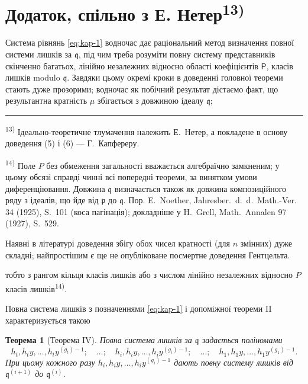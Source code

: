 \documentclass[11pt]{article}
\newcommand{\foreign}[1]{#1}
\theoremstyle{plain}
\newtheorem{satz}{Теорема}
\begin{document}
\newpage
\section*{Додаток, спільно з Е. Нетер\textsuperscript{13)}}

Система рівнянь \eqref{eq:kap-1} водночас дає раціональний метод
визначення повної системи лишків за $\mathfrak{q}$, під чим треба
розуміти повну систему представників скінченно багатьох, лінійно
незалежних відносно області коефіцієнтів $\mathsf{P}$, класів лишків modulo
$\mathfrak{q}$. Завдяки цьому окремі кроки в доведенні головної
теореми стають дуже прозорими; водночас як побічний результат
дістаємо факт, що результантна кратність $\mu$ збігається з
довжиною ідеалу $\mathfrak{q}$;

\vspace{0.5em}
\noindent\rule{\textwidth}{0.4pt}
\vspace{0.3em}

{\footnotesize
\textsuperscript{13)} Ідеально-теоретичне тлумачення належить Е.\ Нетер, а
покладене в основу доведення (5) і (6) --- Г.\ Капфереру.

\textsuperscript{14)} Поле $P$ без обмеження загальності вважається
алгебраїчно замкненим; у цьому обсязі справді чинні всі попередні
теореми, за винятком умови диференціювання. Довжина $\mathfrak{q}$
визначається також як довжина композиційного ряду з ідеалів, що йде
від $\mathfrak{p}$ до $\mathfrak{q}$. Пор. E.\ Noether,
\foreign{Jahresber.\ d.\ d.\ Math.-Ver.} 34 (1925), S.~101
(коса пагінація); докладніше у H.\ Grell, \foreign{Math.\ Annalen} 97
(1927), S.~529.

Наявні в літературі доведення збігу обох чисел кратності (для $n$
змінних) дуже складні; найпростішим є ще не опубліковане посмертне
доведення Гентцельта.
}

\vspace{1em}
тобто з рангом кільця класів лишків або з числом лінійно незалежних
відносно $P$ класів лишків\textsuperscript{14)}.

Повна система лишків з позначеннями \eqref{eq:kap-1} і допоміжної
теореми II характеризується такою

\begin{satz}[Теорема IV]\label{satz:kap-IV}
Повна система лишків за $\mathfrak{q}$ задається поліномами
\[
h_{t}, h_{t}y, \ldots, h_{t}y^{(g_{t})-1}; \quad \ldots; \quad
h_{i}, h_{i}y, \ldots, h_{i}y^{(g_{i})-1}; \quad \ldots; \quad
h_{1}, h_{1}y, \ldots, h_{1}y^{(g_{1})-1}.
\]
При цьому кожного разу
$h_{i}, h_{i}y, \ldots, h_{i}y^{(g_{i})-1}$ дають повну систему
лишків від $\mathfrak{q}^{(i+1)}$ до $\mathfrak{q}^{(i)}$.
\end{satz}
\end{document}
